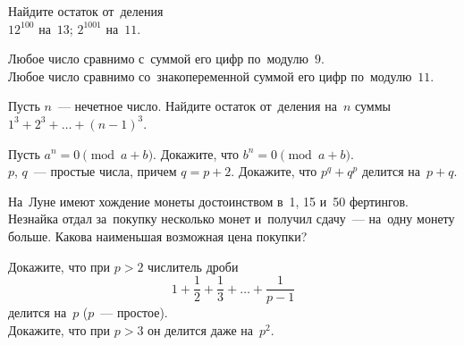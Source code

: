



\begin{problems}

Найдите остаток от~деления
\\
\subproblem $12^{100}$ на~$13$;
\qquad
\subproblem $2^{1001}$ на~$11$.


\item
\subproblem
Любое число сравнимо с~суммой его цифр по~модулю~$9$.
\\
\subproblem
Любое число сравнимо со~знакопеременной суммой его цифр по~модулю~$11$.

\item
Пусть $n$~--- нечетное число.
Найдите остаток от~деления на~$n$ суммы $1^3 + 2^3 + \ldots + (n - 1)^3$.

\item
\subproblem
Пусть $a^{n} = 0 \pmod{a + b}$.
Докажите, что $b^{n} = 0 \pmod{a + b}$.
\\
\subproblem
$p$, $q$~--- простые числа, причем $q = p + 2$.
Докажите, что $p^{q} + q^{p}$ делится на~$p + q$.

\item
На~Луне имеют хождение монеты достоинством в~1, 15 и~50 фертингов.
Незнайка отдал за~покупку несколько монет и~получил сдачу~--- на~одну монету
больше.
Какова наименьшая возможная цена покупки?

\item
\subproblem
Докажите, что при $p > 2$ числитель дроби
\[
    1 + \frac{1}{2} + \frac{1}{3} + \ldots + \frac{1}{p - 1}
\]
делится на~$p$ ($p$~--- простое).
\\
\subproblemx{*}
Докажите, что при $p > 3$ он делится даже на~$p^2$.

\end{problems}

